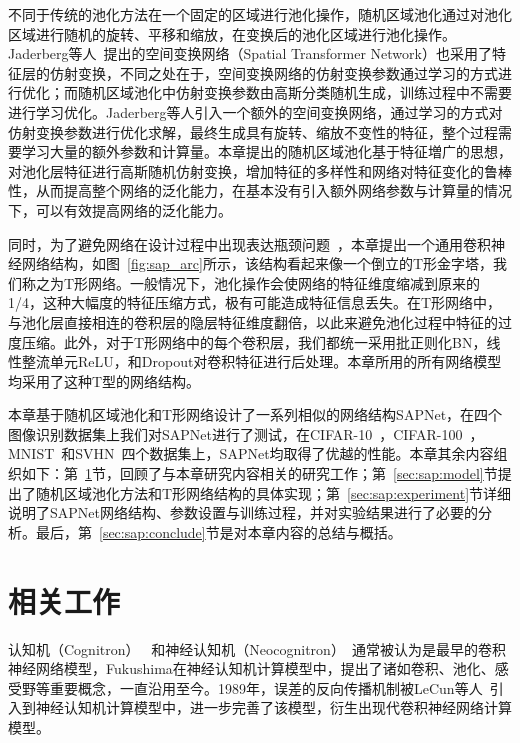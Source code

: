不同于传统的池化方法在一个固定的区域进行池化操作，随机区域池化通过对池化区域进行随机的旋转、平移和缩放，在变换后的池化区域进行池化操作。Jaderberg等人~\cite{jaderberg2015spatial}提出的空间变换网络（Spatial Transformer Network）也采用了特征层的仿射变换，不同之处在于，空间变换网络的仿射变换参数通过学习的方式进行优化；而随机区域池化中仿射变换参数由高斯分类随机生成，训练过程中不需要进行学习优化。Jaderberg等人引入一个额外的空间变换网络，通过学习的方式对仿射变换参数进行优化求解，最终生成具有旋转、缩放不变性的特征，整个过程需要学习大量的额外参数和计算量。本章提出的随机区域池化基于特征増广的思想，对池化层特征进行高斯随机仿射变换，增加特征的多样性和网络对特征变化的鲁棒性，从而提高整个网络的泛化能力，在基本没有引入额外网络参数与计算量的情况下，可以有效提高网络的泛化能力。

同时，为了避免网络在设计过程中出现表达瓶颈问题~\cite{szegedy2015rethinking}，本章提出一个通用卷积神经网络结构，如图~\ref{fig:sap_arc}所示，该结构看起来像一个倒立的T形金字塔，我们称之为T形网络。一般情况下，池化操作会使网络的特征维度缩减到原来的 1/4，这种大幅度的特征压缩方式，极有可能造成特征信息丢失。在T形网络中，与池化层直接相连的卷积层的隐层特征维度翻倍，以此来避免池化过程中特征的过度压缩。此外，对于T形网络中的每个卷积层，我们都统一采用批正则化BN，线性整流单元ReLU，和Dropout对卷积特征进行后处理。本章所用的所有网络模型均采用了这种T型的网络结构。

本章基于随机区域池化和T形网络设计了一系列相似的网络结构SAPNet，在四个图像识别数据集上我们对SAPNet进行了测试，在CIFAR-10~\cite{krizhevsky2009learning}，CIFAR-100~\cite{krizhevsky2009learning}，MNIST~\cite{lecun1998gradient}和SVHN~\cite{netzer2011reading}四个数据集上，SAPNet均取得了优越的性能。本章其余内容组织如下：第~\ref{sec:sap:relate}节，回顾了与本章研究内容相关的研究工作；第~\ref{sec:sap:model}节提出了随机区域池化方法和T形网络结构的具体实现；第~\ref{sec:sap:experiment}节详细说明了SAPNet网络结构、参数设置与训练过程，并对实验结果进行了必要的分析。最后，第~\ref{sec:sap:conclude}节是对本章内容的总结与概括。

\section{相关工作}
\label{sec:sap:relate}

认知机（Cognitron）~\cite{fukushima1975cognitron} 和神经认知机（Neocognitron）~\cite{fukushima1980neocognitron}通常被认为是最早的卷积神经网络模型，Fukushima在神经认知机计算模型中，提出了诸如卷积、池化、感受野等重要概念，一直沿用至今。1989年，误差的反向传播机制被LeCun等人~\cite{lecun1989backpropagation}引入到神经认知机计算模型中，进一步完善了该模型，衍生出现代卷积神经网络计算模型。

